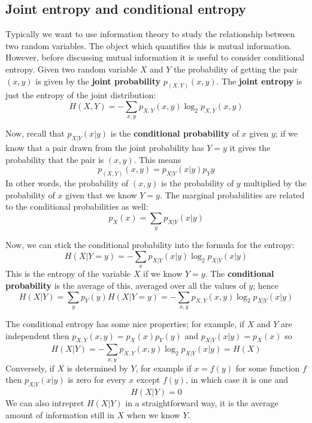 \documentclass[12pt]{article}
\begin{document}
\subsection*{Joint entropy and conditional entropy}

Typically we want to use information theory to study the relationship
between two random variables. The object which quantifies this is
mutual information. However, before discussing mutual information it
is useful to consider conditional entropy. Given two random variable
$X$ and $Y$ the probability of getting the pair $(x,y)$ is given by
the \textbf{joint probability} $p_{(X,Y)}(x,y)$. The \textbf{joint entropy} is just the entropy of the joint distribution:
\begin{equation}
H(X,Y)=-\sum_{x,y}p_{X,Y}(x,y)\log_2{p_{X,Y}(x,y)}
\end{equation}

Now, recall that
$p_{X|Y}(x|y)$ is the \textbf{conditional probability} of $x$ given $y$; if we
know that a pair drawn from the joint probability has $Y=y$ it gives
the probability that the pair is $(x,y)$. This means
\begin{equation}
p_{(X,Y)}(x,y)=p_{X|Y}(x|y)p_Y{y}
\end{equation}
In other words, the probability of $(x,y)$ is the probability of $y$
multiplied by the probability of $x$ given that we know $Y=y$. The
marginal probabilities are related to the conditional probabilities as well:
\begin{equation}
p_X(x)=\sum_y p_{X|Y}(x|y)
\end{equation}

Now, we can stick the conditional probability into the formula for the entropy:
\begin{equation}
H(X|Y=y)=-\sum_{x} p_{X|Y}(x|y)\log_2{p_{X|Y}(x|y)}
\end{equation}
This is the entropy of the variable $X$ if we know $Y=y$. The \textbf{conditional probability} is the average of this, averaged over all the values of $y$; hence
\begin{equation}
H(X|Y)=\sum_y p_Y(y) H(X|Y=y)=-\sum_{x,y}p_{X,Y}(x,y)\log_2{p_{X|Y}(x|y)}
\end{equation}

The conditional entropy has some nice properties; for example, if $X$ and $Y$ are independent then $p_{X,Y}(x,y)=p_X(x)p_Y(y)$ and $p_{X|Y}(x|y)=p_X(x)$ so
\begin{equation}
H(X|Y)=-\sum_{x,y}p_{X,Y}(x,y)\log_2{p_{X|Y}(x|y)}=H(X)
\end{equation}
Conversely, if $X$ is determined by $Y$, for example if $x=f(y)$ for some function $f$ then $p_{X|Y}(x|y)$ is zero for every $x$ except $f(y)$, in which case it is one and
\begin{equation}
H(X|Y)=0
\end{equation}
We can also intrepret $H(X|Y)$ in a straightforward way, it is the average amount of information still in $X$ when we know $Y$.
\end{document}
